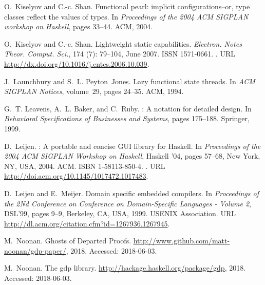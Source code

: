 \documentclass[format=sigplan, review=false, screen=true, 10pt]{acmart}
\begin{document}
\begin{thebibliography}{22}
O.~Kiselyov and C.-c. Shan.
\newblock Functional pearl: implicit configurations--or, type classes reflect
  the values of types.
\newblock In \emph{Proceedings of the 2004 ACM SIGPLAN workshop on Haskell},
  pages 33--44. ACM, 2004.

O.~Kiselyov and C.-c. Shan.
\newblock Lightweight static capabilities.
\newblock \emph{Electron. Notes Theor. Comput. Sci.}, 174
  (7): 79--104, June 2007.
\newblock ISSN 1571-0661.
\newblock {}.
\newblock URL \url{http://dx.doi.org/10.1016/j.entcs.2006.10.039}.

J.~Launchbury and S.~L. Peyton~Jones.
\newblock Lazy functional state threads.
\newblock In \emph{ACM SIGPLAN Notices}, volume~29, pages 24--35. ACM, 1994.

G.~T. Leavens, A.~L. Baker, and C.~Ruby.
: A notation for detailed design.
\newblock In \emph{Behavioral Specifications of Businesses and Systems}, pages
  175--188. Springer, 1999.

D.~Leijen.
: A portable and concise {GUI} library for {Haskell}.
\newblock In \emph{Proceedings of the 2004 ACM SIGPLAN Workshop on Haskell},
  Haskell '04, pages 57--68, New York, NY, USA, 2004. ACM.
\newblock ISBN 1-58113-850-4.
\newblock {}.
\newblock URL \url{http://doi.acm.org/10.1145/1017472.1017483}.


D.~Leijen and E.~Meijer.
\newblock Domain specific embedded compilers.
\newblock In \emph{Proceedings of the 2Nd Conference on Conference on
  Domain-Specific Languages - Volume 2}, DSL'99, pages 9--9, Berkeley, CA, USA,
  1999. USENIX Association.
\newblock URL \url{http://dl.acm.org/citation.cfm?id=1267936.1267945}.

\vspace{6in}

M.~Noonan.
\newblock Ghosts of {D}eparted {P}roofs.
\newblock \url{http://www.github.com/matt-noonan/gdp-paper/},
  2018{}.
\newblock Accessed: 2018-06-03.

M.~Noonan.
\newblock The {gdp} library.
\newblock \url{http://hackage.haskell.org/package/gdp}, 2018{}.
\newblock Accessed: 2018-06-03.


\end{thebibliography}
\end{document}
